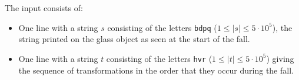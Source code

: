 
  The input consists of:
  \begin{itemize}
    \item One line with a string $s$ consisting of the letters \texttt{bdpq} ($1 \le |s| \le 5\cdot 10^5$), the string printed on the glass object as seen at the start of the fall.
    \item One line with a string $t$ consisting of the letters \texttt{hvr}  ($1 \le |t| \le 5\cdot 10^5$) giving the sequence of transformations in the order that they occur during the fall.
  \end{itemize}
